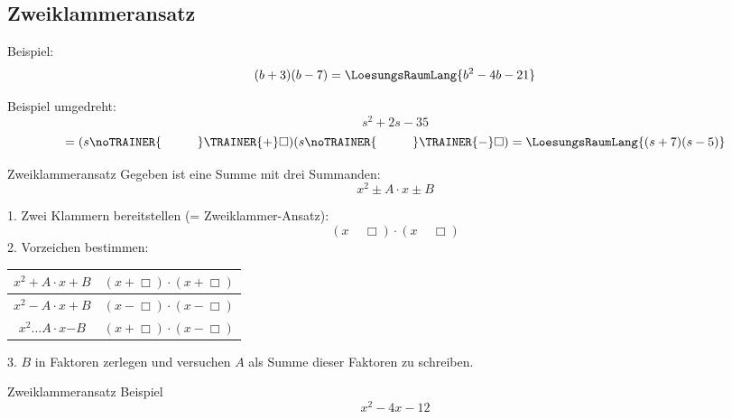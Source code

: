 
\newpage



\subsection{Zweiklammeransatz}
Beispiel: $$(b+3)(b-7)= \LoesungsRaumLang{b^2-4b-21}$$

Beispiel umgedreht: $$s^2+2s-35$$
$$=(s\noTRAINER{\hspace{1cm}}\TRAINER{+}\Box{})(s\noTRAINER{\hspace{1cm}}\TRAINER{-}\Box{}) = \LoesungsRaumLang{(s+7)(s-5)}$$


\begin{rezept}{Zweiklammeransatz}{}
Gegeben ist eine Summe mit drei Summanden:
$$x^2 \pm A\cdot{}x \pm B$$

1. Zwei Klammern bereitstellen (= Zweiklammer-Ansatz):
$$(x \,\,\,\,\,\,\, \Box)\cdot{}(x \,\,\,\,\,\,\, \Box)$$
2. Vorzeichen bestimmen:
\leserluft{}

  \begin{tabular}{|c@{$\Longrightarrow$}c|}\hline
   $x^2 + A\cdot{} x + B$ & $(x + \Box)\cdot{}(x + \Box)$\\\hline
   $x^2 - A\cdot{} x + B$ & $(x - \Box)\cdot{}(x - \Box)$\\\hline
   $x^2 ... A\cdot{} x \mathbf{-} B$ & $(x + \Box)\cdot{}(x - \Box)$\\\hline
   \end{tabular} 

\leserluft{}

3. $B$ in Faktoren zerlegen und versuchen $A$ als Summe dieser Faktoren zu schreiben.
\end{rezept}
\newpage
\begin{beispiel}{Zweiklammeransatz}{}
Beispiel
$$x^2 - 4x - 12$$
\end{beispiel}


